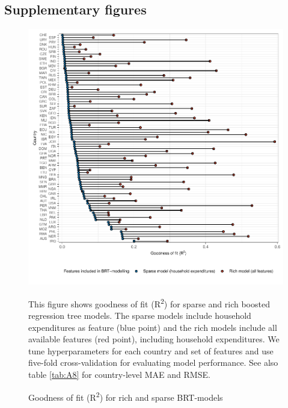 \documentclass[12pt, a4paper]{article}
\newenvironment{subcaption2}
{\strut
\vspace{-5pt}
\begin{minipage}[b]{0.95\textwidth}
  \hspace*{-\parindent}
  \footnotesize}
 {\end{minipage}}
\begin{document}
\begin{refsection}
\section{Supplementary figures} \label{sec:figures}




\clearpage


\clearpage


\clearpage


\clearpage

\begin{figure}[ht!]
    \centering
    \includegraphics[width=\textwidth]{1_Figures/Figures_Appendix/Figure_Comparison_Models.pdf}
    \caption{Goodness of fit (R\textsuperscript{2}) for rich and sparse BRT-models}\label{fig:comparison}
    \label{fig:comparison_models}
    \begin{subcaption2}
    This figure shows goodness of fit (R\textsuperscript{2}) for sparse and rich boosted regression tree models. The sparse models include household expenditures as feature (blue point) and the rich models include all available features (red point), including household expenditures. We tune hyperparameters for each country and set of features and use five-fold cross-validation for evaluating model performance. See also table \ref{tab:A8} for country-level MAE and RMSE.
    \end{subcaption2}
\end{figure}


\end{refsection}
\end{document}
